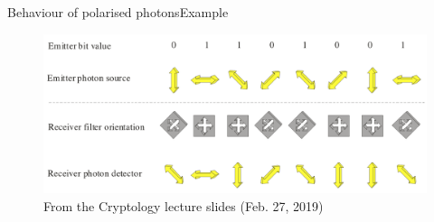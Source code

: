 \documentclass{beamer}
\begin{document}
\begin{frame}{Behaviour of polarised photons}{Example}
\begin{figure}
    \centering
    \includegraphics[width=\textwidth, keepaspectratio]{presentation/res/photon-behaviour.png}
    \caption{From the Cryptology lecture slides (Feb. 27, 2019)
    }
    \label{fig:my_label}
\end{figure}


\end{frame}
\end{document}
